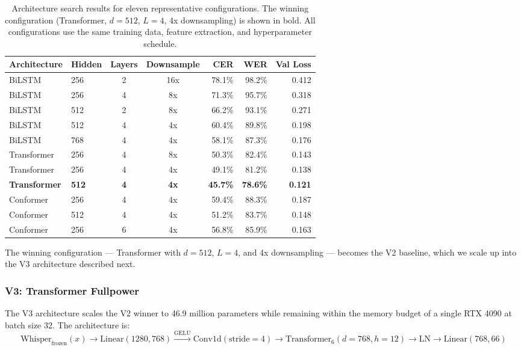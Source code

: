 \documentclass[11pt]{article}
\begin{document}
\begin{table}[ht]
\centering
\caption{Architecture search results for eleven representative configurations. The winning configuration (Transformer, $d=512$, $L=4$, 4x downsampling) is shown in bold. All configurations use the same training data, feature extraction, and hyperparameter schedule.}
\label{tab:archsearch}
\begin{tabular}{@{}llccrrr@{}}
\toprule
Architecture & Hidden & Layers & Downsample & CER & WER & Val Loss \\
\midrule
BiLSTM & 256 & 2 & 16x & 78.1\% & 98.2\% & 0.412 \\
BiLSTM & 256 & 4 & 8x & 71.3\% & 95.7\% & 0.318 \\
BiLSTM & 512 & 2 & 8x & 66.2\% & 93.1\% & 0.271 \\
BiLSTM & 512 & 4 & 4x & 60.4\% & 89.8\% & 0.198 \\
BiLSTM & 768 & 4 & 4x & 58.1\% & 87.3\% & 0.176 \\
Transformer & 256 & 4 & 8x & 50.3\% & 82.4\% & 0.143 \\
Transformer & 256 & 4 & 4x & 49.1\% & 81.2\% & 0.138 \\
\textbf{Transformer} & \textbf{512} & \textbf{4} & \textbf{4x} & \textbf{45.7\%} & \textbf{78.6\%} & \textbf{0.121} \\
Conformer & 256 & 4 & 4x & 59.4\% & 88.3\% & 0.187 \\
Conformer & 512 & 4 & 4x & 51.2\% & 83.7\% & 0.148 \\
Conformer & 256 & 6 & 4x & 56.8\% & 85.9\% & 0.163 \\
\bottomrule
\end{tabular}
\end{table}

The winning configuration --- Transformer with $d=512$, $L=4$, and 4x downsampling --- becomes the V2 baseline, which we scale up into the V3 architecture described next.

\subsubsection{V3: Transformer Fullpower}

The V3 architecture scales the V2 winner to 46.9 million parameters while remaining within the memory budget of a single RTX 4090 at batch size 32. The architecture is:
\begin{equation}
\text{Whisper}_{\text{frozen}}(x) \to \text{Linear}(1280, 768) \xrightarrow{\text{GELU}} \text{Conv1d}(\text{stride}=4) \to \text{Transformer}_6(d=768, h=12) \to \text{LN} \to \text{Linear}(768, 66)
\label{eq:v3}
\end{equation}
\end{document}
